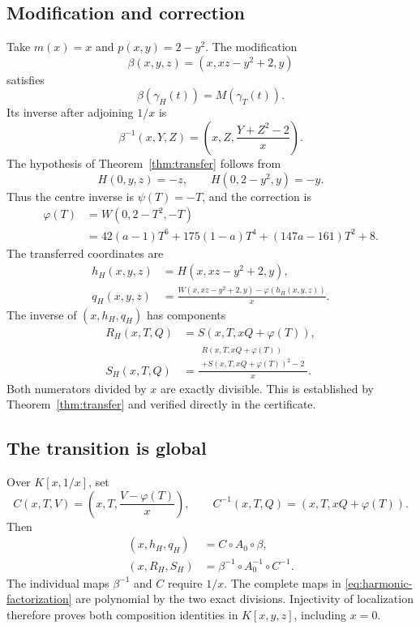 \documentclass[11pt,a4paper]{article}
\newcommand{\comp}{\circ}
\begin{document}
\subsection{Modification and correction}

Take $m(x)=x$ and $p(x,y)=2-y^2$. The modification
\[
\beta(x,y,z)=(x,xz-y^2+2,y)
\]
satisfies
\begin{equation}\label{eq:curve-transition}
\boxed{\beta(\gamma_H(t))=M(\gamma_T(t)).}
\end{equation}
Its inverse after adjoining $1/x$ is
\[
\beta^{-1}(x,Y,Z)=\left(x,Z,\frac{Y+Z^2-2}{x}\right).
\]
The hypothesis of Theorem~\ref{thm:transfer} follows from
\[
H(0,y,z)=-z,\qquad H(0,2-y^2,y)=-y.
\]
Thus the centre inverse is $\psi(T)=-T$, and the correction is
\begin{equation}\label{eq:harmonic-correction}
\begin{aligned}
\varphi(T)&=W(0,2-T^2,-T)\\
&=42(a-1)T^6+175(1-a)T^4+(147a-161)T^2+8.
\end{aligned}
\end{equation}
The transferred coordinates are
\begin{equation}\label{eq:harmonic-relative}
\begin{aligned}
h_H(x,y,z)&=H(x,xz-y^2+2,y),\\
q_H(x,y,z)&=
\frac{W(x,xz-y^2+2,y)-\varphi(h_H(x,y,z))}{x}.
\end{aligned}
\end{equation}
The inverse of $(x,h_H,q_H)$ has components
\begin{equation}\label{eq:harmonic-relative-inverse}
\begin{aligned}
R_H(x,T,Q)&=S(x,T,xQ+\varphi(T)),\\
S_H(x,T,Q)&=
\frac{\begin{gathered}
R(x,T,xQ+\varphi(T))\\[-2pt]
+S(x,T,xQ+\varphi(T))^2-2
\end{gathered}}{x}.
\end{aligned}
\end{equation}
Both numerators divided by $x$ are exactly divisible. This is established
by Theorem~\ref{thm:transfer} and verified directly in the certificate.

\subsection{The transition is global}

Over $K[x,1/x]$, set
\[
C(x,T,V)=\left(x,T,\frac{V-\varphi(T)}x\right),\qquad
C^{-1}(x,T,Q)=(x,T,xQ+\varphi(T)).
\]
Then
\begin{equation}\label{eq:harmonic-factorization}
\begin{aligned}
(x,h_H,q_H)&=C\comp A_0\comp\beta,\\
(x,R_H,S_H)&=\beta^{-1}\comp A_0^{-1}\comp C^{-1}.
\end{aligned}
\end{equation}
The individual maps $\beta^{-1}$ and $C$ require $1/x$. The complete maps
in \eqref{eq:harmonic-factorization} are polynomial by the two exact
divisions. Injectivity of localization therefore proves both composition
identities in $K[x,y,z]$, including $x=0$.
\end{document}
